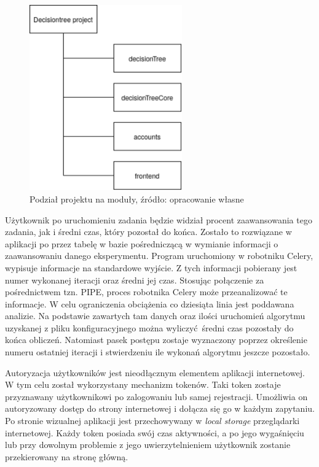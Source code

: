 \begin{figure}[htb]
	\centering
	\includegraphics[height=8cm]{grafika/packages.eps}
	\caption{Podział projektu na moduły, źródło: opracowanie własne}
	\label{rys4_packages}
\end{figure}
Użytkownik po uruchomieniu zadania będzie widział procent zaawansowania tego zadania, jak i średni czas, który pozostał do końca. Zostało to rozwiązane w aplikacji po przez tabelę w bazie pośredniczącą w wymianie informacji o zaawansowaniu danego eksperymentu. Program uruchomiony w robotniku Celery, wypisuje informacje na standardowe wyjście. Z tych informacji pobierany jest numer wykonanej iteracji oraz średni jej czas. Stosując połączenie za pośrednictwem tzn. PIPE, proces robotnika Celery może przeanalizować te informacje. W celu ograniczenia obciążenia co dziesiąta linia jest poddawana analizie. Na podstawie zawartych tam danych oraz ilości uruchomień algorytmu uzyskanej z pliku konfiguracyjnego można wyliczyć średni czas pozostały do końca obliczeń. Natomiast pasek postępu zostaje wyznaczony poprzez określenie numeru ostatniej iteracji i stwierdzeniu ile wykonań algorytmu jeszcze pozostało. 

Autoryzacja użytkowników jest nieodłącznym elementem aplikacji internetowej. W tym celu został wykorzystany mechanizm tokenów. Taki token zostaje przyznawany użytkownikowi po zalogowaniu lub samej rejestracji. Umożliwia on autoryzowany dostęp do strony internetowej i dołącza się go w każdym zapytaniu. Po stronie wizualnej aplikacji jest przechowywany w \textit{local storage} przeglądarki internetowej. Każdy token posiada swój czas aktywności, a po jego wygaśnięciu lub przy dowolnym problemie z jego uwierzytelnieniem użytkownik zostanie przekierowany na stronę główną. 

